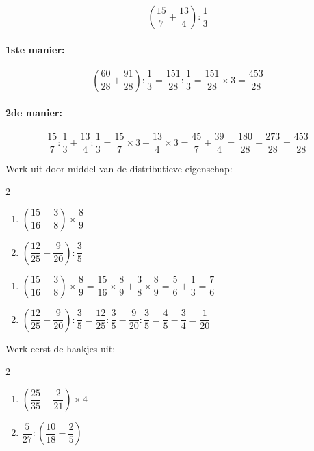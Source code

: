 \documentclass{bis}
\begin{document}
\begin{voorbeeld}
\[\left(\dfrac{15}{7}+\dfrac{13}{4}\right):\dfrac{1}{3}\]

\paragraph*{1ste manier:}
\[\left(\dfrac{60}{28}+\dfrac{91}{28}\right):\dfrac{1}{3}=\dfrac{151}{28}:\dfrac{1}{3}=\dfrac{151}{28}\times 3=\dfrac{453}{28}\]

\paragraph*{2de manier:}
\[\dfrac{15}{7}:\dfrac{1}{3}+\dfrac{13}{4}:\dfrac{1}{3}=\dfrac{15}{7}\times 3+\dfrac{13}{4}\times 3=\dfrac{45}{7}+\dfrac{39}{4}=\dfrac{180}{28}+\dfrac{273}{28}=\dfrac{453}{28}\]
\end{voorbeeld}

\begin{exercise}
Werk uit door middel van de distributieve eigenschap:
\begin{multicols}{2}
  \begin{enumerate}
    \item $\left(\dfrac{15}{16}+\dfrac{3}{8}\right)\times\dfrac{8}{9}$
    \item $\left(\dfrac{12}{25}-\dfrac{9}{20}\right):\dfrac{3}{5}$
  \end{enumerate}
\end{multicols}
\end{exercise}

\begin{solution}
  \begin{enumerate}
    \item $\left(\dfrac{15}{16}+\dfrac{3}{8}\right)\times\dfrac{8}{9}=\dfrac{15}{16}\times\dfrac{8}{9}+\dfrac{3}{8}\times\dfrac{8}{9}=\dfrac{5}{6}+\dfrac{1}{3}=\dfrac{7}{6}$
    \item $\left(\dfrac{12}{25}-\dfrac{9}{20}\right):\dfrac{3}{5}=\dfrac{12}{25}:\dfrac{3}{5}-\dfrac{9}{20}:\dfrac{3}{5}=\dfrac{4}{5}-\dfrac{3}{4}=\dfrac{1}{20}$
  \end{enumerate}
\end{solution}

\begin{exercise}
Werk eerst de haakjes uit:
\begin{multicols}{2}
  \begin{enumerate}
    \item $\left(\dfrac{25}{35}+\dfrac{2}{21}\right)\times 4$
    \item $\dfrac{5}{27}:\left(\dfrac{10}{18}-\dfrac{2}{5}\right)$
  \end{enumerate}
\end{multicols}
\end{exercise}
\end{document}
